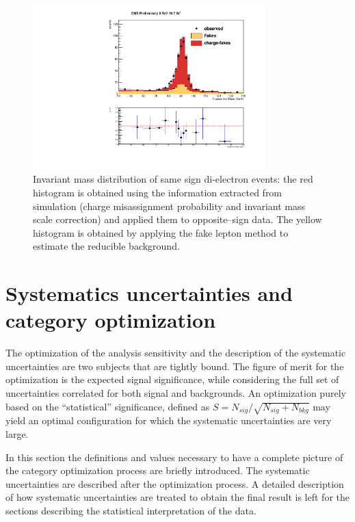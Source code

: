 \begin{figure}
  \begin{center}
  \includegraphics[width=0.8\textwidth]{4_Analisys/pics/8TeV/plots/zee/EE_Charge_Flip_xcheck_trk_invMass.pdf}
  \caption{Invariant mass distribution of same sign di-electron events: the red histogram is obtained using the information extracted from simulation
(charge misassignment probability and invariant mass scale correction) and applied them to opposite--sign data. The yellow histogram is obtained by applying the fake lepton method to estimate the reducible background.}
  \label{fig:control_Zee}
  \end{center}
\end{figure}

\section{Systematics uncertainties and category optimization}
\label{sec:systematics}

The optimization of the analysis sensitivity and the description of the systematic uncertainties are two subjects that are tightly bound. The figure of merit for %
the optimization is the expected signal significance, while considering the full set of uncertainties correlated for both signal and backgrounds. An optimization purely based on the ``statistical'' significance, defined as $S = N_{sig} / \sqrt{N_{sig} + N_{bkg}}$ may yield an optimal configuration for which the systematic uncertainties are very large.

In this section the definitions and values necessary to have a complete picture of the category optimization process are briefly introduced. The systematic uncertainties are described after the optimization process.
A detailed description of how systematic uncertainties are treated to obtain the final result is left for the sections describing the statistical interpretation of the data.

